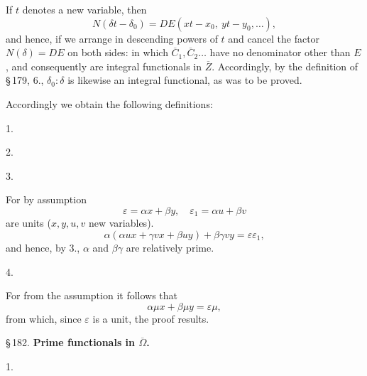 If $t$ denotes a new variable, then
\[
N(\delta t - \delta_0) = D E(x t - x_0,\ y t - y_0, \ldots),
\]
and hence, if we arrange in descending powers of $t$ and cancel the factor $N(\delta) = D E$ on both sides:
in which $\overline{C}_1, \overline{C}_2 \ldots$ have no denominator other than $E$, and consequently are integral functionals in $\overline{Z}$. Accordingly, by the definition of \S\,179, 6., $\delta_0 : \delta$ is likewise an integral functional, as was to be proved.

Accordingly we obtain the following definitions:

1. 

2. 

3. 

For by assumption
\[
\varepsilon = \alpha x + \beta y,\quad \varepsilon_1 = \alpha u + \beta v
\]
are units ($x, y, u, v$ new variables).
\[
\alpha(\alpha u x + \gamma v x + \beta u y) + \beta \gamma v y = \varepsilon \varepsilon_1,
\]
and hence, by 3., $\alpha$ and $\beta\gamma$ are relatively prime.

4. 

For from the assumption it follows that
\[
\alpha \mu x + \beta \mu y = \varepsilon \mu,
\]
from which, since $\varepsilon$ is a unit, the proof results.

\begin{center}
\S\,182. \textbf{Prime functionals in $\overline{\Omega}$.}
\end{center}

1. 
